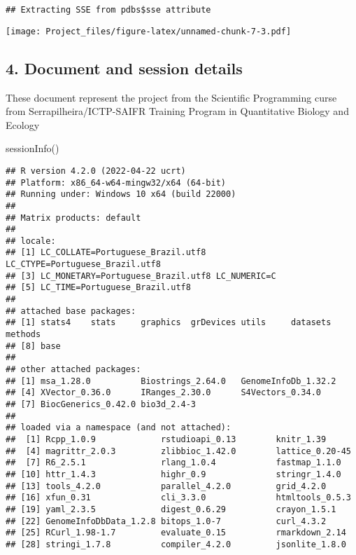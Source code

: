 \documentclass[
]{article}
\newenvironment{Shaded}{\begin{snugshade}}{\end{snugshade}}
\newcommand{\FunctionTok}[1]{\textcolor[rgb]{0.00,0.00,0.00}{#1}}
\newcommand{\NormalTok}[1]{#1}
\begin{document}
\begin{verbatim}
## Extracting SSE from pdbs$sse attribute
\end{verbatim}

\texttt{[image: Project\_files/figure-latex/unnamed-chunk-7-3.pdf]}

\hypertarget{document-and-session-details}{%
\subsection{4. Document and session
details}\label{document-and-session-details}}

These document represent the project from the Scientific Programming
curse from Serrapilheira/ICTP-SAIFR Training Program in Quantitative
Biology and Ecology

\begin{Shaded}
\begin{Highlighting}[]
\FunctionTok{sessionInfo}\NormalTok{()}
\end{Highlighting}
\end{Shaded}

\begin{verbatim}
## R version 4.2.0 (2022-04-22 ucrt)
## Platform: x86_64-w64-mingw32/x64 (64-bit)
## Running under: Windows 10 x64 (build 22000)
## 
## Matrix products: default
## 
## locale:
## [1] LC_COLLATE=Portuguese_Brazil.utf8  LC_CTYPE=Portuguese_Brazil.utf8   
## [3] LC_MONETARY=Portuguese_Brazil.utf8 LC_NUMERIC=C                      
## [5] LC_TIME=Portuguese_Brazil.utf8    
## 
## attached base packages:
## [1] stats4    stats     graphics  grDevices utils     datasets  methods  
## [8] base     
## 
## other attached packages:
## [1] msa_1.28.0          Biostrings_2.64.0   GenomeInfoDb_1.32.2
## [4] XVector_0.36.0      IRanges_2.30.0      S4Vectors_0.34.0   
## [7] BiocGenerics_0.42.0 bio3d_2.4-3        
## 
## loaded via a namespace (and not attached):
##  [1] Rcpp_1.0.9             rstudioapi_0.13        knitr_1.39            
##  [4] magrittr_2.0.3         zlibbioc_1.42.0        lattice_0.20-45       
##  [7] R6_2.5.1               rlang_1.0.4            fastmap_1.1.0         
## [10] httr_1.4.3             highr_0.9              stringr_1.4.0         
## [13] tools_4.2.0            parallel_4.2.0         grid_4.2.0            
## [16] xfun_0.31              cli_3.3.0              htmltools_0.5.3       
## [19] yaml_2.3.5             digest_0.6.29          crayon_1.5.1          
## [22] GenomeInfoDbData_1.2.8 bitops_1.0-7           curl_4.3.2            
## [25] RCurl_1.98-1.7         evaluate_0.15          rmarkdown_2.14        
## [28] stringi_1.7.8          compiler_4.2.0         jsonlite_1.8.0
\end{verbatim}
\end{document}
